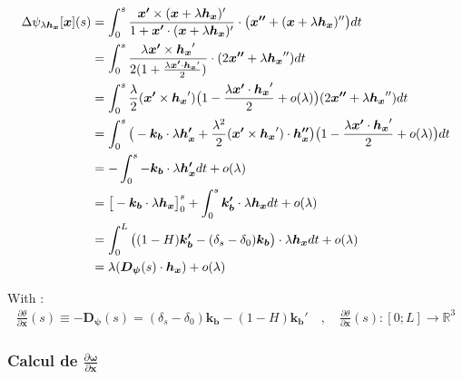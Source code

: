 \begin{align}
	\Delta\psi_{\lambda\boldsymbol{h_x}}[\boldsymbol{x}](s) & = \int_{0}^{s} \frac{\boldsymbol{x'} \times (\boldsymbol{x} + \lambda\boldsymbol{h_x})'}{1+ \boldsymbol{x'} \cdot  (\boldsymbol{x} + \lambda\boldsymbol{h_x})'} \cdot \big(\boldsymbol{x''} + (\boldsymbol{x} + \lambda\boldsymbol{h_x})''\big) dt \\
	& = \int_{0}^{s} \frac{\lambda \boldsymbol{x'} \times \boldsymbol{h_x}'}{2(1+ \frac{\lambda \boldsymbol{x'} \cdot \boldsymbol{h_x}'}{2})} \cdot (2\boldsymbol{x''} + \lambda\boldsymbol{h_x}'') dt \notag\\
	& = \int_{0}^{s} \frac{\lambda}{2}(\boldsymbol{x'} \times \boldsymbol{h_x}')\big(1- \frac{\lambda \boldsymbol{x'} \cdot \boldsymbol{h_x}'}{2} + o(\lambda)\big)(2\boldsymbol{x''} + \lambda\boldsymbol{h_x}'') dt \notag\\
	& = \int_{0}^{s} \big(-\boldsymbol{k_b} \cdot \lambda \boldsymbol{h_x'} + \frac{\lambda^2}{2}(\boldsymbol{x'} \times \boldsymbol{h_x}')\cdot\boldsymbol{h_x''}\big)\big(1- \frac{\lambda \boldsymbol{x'} \cdot \boldsymbol{h_x}'}{2} + o(\lambda)\big) dt \notag\\
	& = - \int_{0}^{s} -\boldsymbol{k_b} \cdot \lambda \boldsymbol{h_x'}dt +o(\lambda) \notag\\
	& = \big[-\boldsymbol{k_b} \cdot \lambda \boldsymbol{h_x}\big]_{0}^{s} + \int_{0}^{s} \boldsymbol{k_b'} \cdot \lambda \boldsymbol{h_x}dt +o(\lambda) \notag\\
	& = \int_{0}^{L} \big((1-H)\boldsymbol{k_b'} - (\delta_s - \delta_0)\boldsymbol{k_b}\big)\cdot\lambda \boldsymbol{h_x}dt +o(\lambda) \notag\\
	& = \lambda(\boldsymbol{D_{\psi}}(s)\cdot\boldsymbol{h_x}) + o(\lambda)\notag
\end{align}

With :
\begin{align}
	\frac{\partial \theta}{\partial \boldsymbol{x}}(s) \equiv -\boldsymbol{D_{\psi}}(s) = (\delta_s - \delta_0)\boldsymbol{k_b} - (1-H)\boldsymbol{k_b'}
	\quad , \quad \frac{\partial \theta}{\partial \boldsymbol{x}}(s) : [0;L] \longrightarrow \mathbb{R}^3
\end{align}



\subsubsection{Calcul de $\frac{\partial \boldsymbol{\omega}}{\partial \boldsymbol{x}}$}

